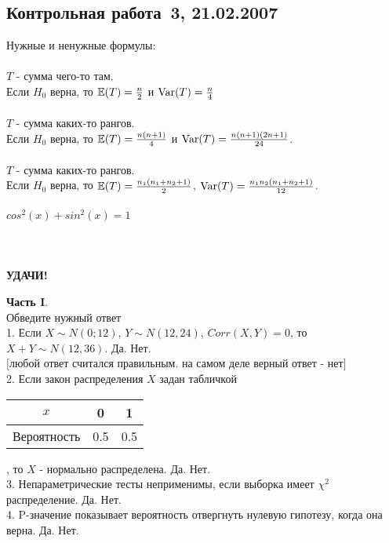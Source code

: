 \documentclass[pdftex,12pt,a4paper]{article}
\begin{document}
\subsection{Контрольная работа \No\,3, 21.02.2007}

Нужные и ненужные формулы: \\ \\
$T$ - сумма чего-то там. \\
Если $H_{0}$ верна, то $\mathbb{E}(T)=\frac{n}{2}$ и $\operatorname{Var}(T)=\frac{n}{4}$ \\ \\
$T$ - сумма каких-то рангов. \\
Если $H_{0}$ верна, то $\mathbb{E}(T)=\frac{n(n+1)}{4}$ и
$\operatorname{Var}(T)=\frac{n(n+1)(2n+1)}{24}$. \\ \\
$T$ - сумма каких-то рангов. \\
Если $H_{0}$ верна, то $\mathbb{E}(T)=\frac{n_{1}(n_{1}+n_{2}+1)}{2}$,
$\operatorname{Var}(T)=\frac{n_{1}n_{2}(n_{1}+n_{2}+1)}{12}$. \\ \\
$cos^{2}(x)+sin^{2}(x)=1$ \\ \\ \\ \\


\textbf{УДАЧИ!}

\pagebreak \textbf{Часть I}. \\
Обведите нужный ответ \\

1. Если $X\sim N(0;12)$, $Y\sim N(12,24)$, $Corr(X,Y)=0$, то
$X+Y\sim N(12,36)$.
Да. Нет. \\
$[$любой ответ считался правильным. на самом деле верный ответ -
нет$]$ \\

2. Если закон распределения $X$ задан табличкой

\begin{tabular}{|c|c|c|}
  \hline
  $x$ & 0 & 1 \\
  \hline
  Вероятность & 0.5 & 0.5 \\
  \hline
\end{tabular}, то $X$ - нормально распределена. Да. Нет. \\

3. Непараметрические тесты неприменимы, если выборка имеет
$\chi^{2}$ распределение. Да. Нет.
\\

4. P-значение показывает вероятность отвергнуть нулевую
гипотезу, когда она верна. Да. Нет. \\
\end{document}
